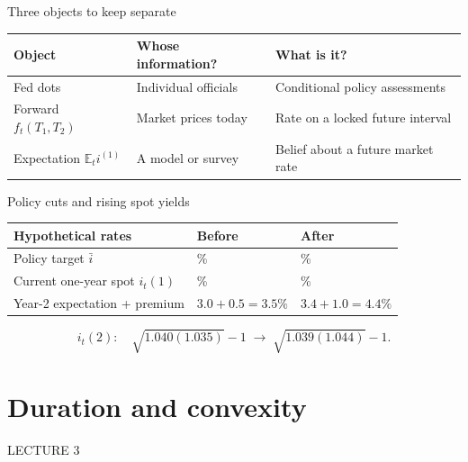 \documentclass[12pt,aspectratio=169]{beamer}
\begin{document}

\begin{frame}{Three objects to keep separate}
\begin{center}\begin{tabular}{@{}>{\raggedright\arraybackslash}p{}>{\raggedright\arraybackslash}p{}>{\raggedright\arraybackslash}p{}@{}}\toprule \textbf{Object} & \textbf{Whose information?} & \textbf{What is it?}\\\midrule Fed dots & Individual officials & Conditional policy assessments\\[2mm]
Forward $f_t(T_1,T_2)$ & Market prices today & Rate on a locked future interval\\[2mm]
Expectation $\mathbb E_t i^{(1)}$ & A model or survey & Belief about a future market rate\\\bottomrule\end{tabular}\end{center}
\end{frame}


\begin{frame}{Policy cuts and rising spot yields}
\begin{center}\begin{tabular}{@{}>{\raggedright\arraybackslash}p{}>{\raggedright\arraybackslash}p{}>{\raggedright\arraybackslash}p{}@{}}\toprule \textbf{Hypothetical rates} & \textbf{Before} & \textbf{After}\\\midrule Policy target $\bar i$ & 4.00\% & 3.75\%\\[2mm]
Current one-year spot $i_t(1)$ & 4.00\% & 3.90\%\\[2mm]
Year-2 expectation + premium & $3.0+0.5=3.5\%$ & $3.4+1.0=4.4\%$\\\bottomrule\end{tabular}\end{center}\[i_t(2):\quad\sqrt{1.040(1.035)}-1\;\longrightarrow\;\sqrt{1.039(1.044)}-1.\]
\end{frame}

\section[Duration and convexity]{Duration and convexity}
\begin{frame}[plain]
{\color{Gold}\large LECTURE 3}\par\vspace{9mm}{\Huge\bfseries Duration and convexity}\par\vspace{7mm}{\Large How does a discount-rate move change the price?}
\end{frame}
\end{document}

